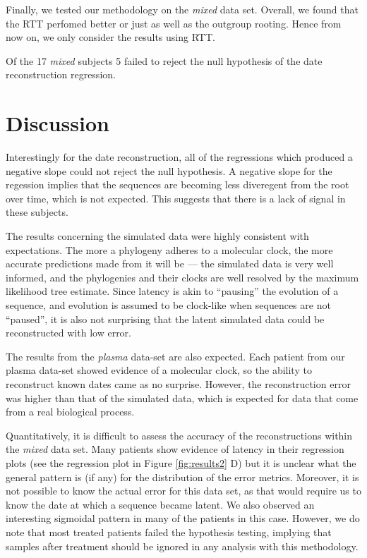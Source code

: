 \documentclass[12pt]{article}
\begin{document}

Finally, we tested our methodology on the {\em mixed} data set. Overall, we found that the RTT perfomed better or just as well as the outgroup rooting. Hence from now on, we only consider the results using RTT.

Of the 17 \emph{mixed} subjects 5 failed to reject the null hypothesis of the date reconstruction regression.


\section * {Discussion} \label{sec:discuss}
Interestingly for the date reconstruction, all of the regressions which produced a negative slope could not reject the null hypothesis. A negative slope for the regession implies that the sequences are becoming less diveregent from the root over time, which is not expected. This suggests that there is a lack of signal in these subjects.


The results concerning the simulated data were highly consistent with expectations. 
The more a phylogeny adheres to a molecular clock, the more accurate predictions made from it will be --- the simulated data is very well informed, and the phylogenies and their clocks are well resolved by the maximum likelihood tree estimate. 
Since latency is akin to ``pausing'' the evolution of a sequence, and evolution is assumed to be clock-like when sequences are not ``paused'', it is also not surprising that the latent simulated data could be reconstructed with low error. 

The results from the {\em plasma} data-set are also expected. 
Each patient from our plasma data-set showed evidence of a molecular clock, so the ability to reconstruct known dates came as no surprise. 
However, the reconstruction error was higher than that of the simulated data, which is expected for data that come from a real biological process.

Quantitatively, it is difficult to assess the accuracy of the reconstructions within the {\em mixed} data set. 
Many patients show evidence of latency in their regression plots (see the regression plot in Figure \ref{fig:results2} D) but it is unclear what the general pattern is (if any) for the distribution of the error metrics. 
Moreover, it is not possible to know the actual error for this data set, as that would require us to know the date at which a sequence became latent. 
We also observed an interesting sigmoidal pattern in many of the patients in this case.
However, we do note that most treated patients failed the hypothesis testing, implying that samples after treatment should be ignored in any analysis with this methodology.
\end{document}
